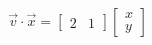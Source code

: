 \documentclass[preview]{standalone}
\begin{document}
\begin{align*}
\vec{v}\cdot\vec{x} = \begin{bmatrix}2&1\end{bmatrix} \begin{bmatrix}x\\y\end{bmatrix}
\end{align*}
\end{document}
